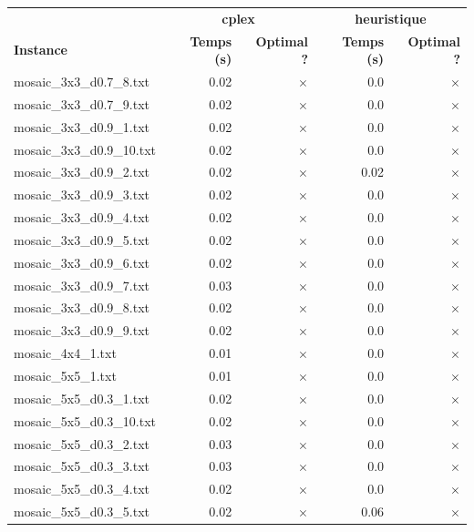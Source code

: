 \documentclass{article}
\begin{document}
\newpage
\begin{center}
\renewcommand{\arraystretch}{1.4} 
 \begin{tabular}{lrrrr}
	\hline
 & \multicolumn{2}{c}{\textbf{cplex}} & \multicolumn{2}{c}{\textbf{heuristique}}\\
\textbf{Instance}  & \textbf{Temps (s)} & \textbf{Optimal ?}  & \textbf{Temps (s)} & \textbf{Optimal ?} \\\hline

mosaic\_3x3\_d0.7\_8.txt & 0.02 & 
$\times$
 & 0.0 & 
$\times$
\\
mosaic\_3x3\_d0.7\_9.txt & 0.02 & 
$\times$
 & 0.0 & 
$\times$
\\
mosaic\_3x3\_d0.9\_1.txt & 0.02 & 
$\times$
 & 0.0 & 
$\times$
\\
mosaic\_3x3\_d0.9\_10.txt & 0.02 & 
$\times$
 & 0.0 & 
$\times$
\\
mosaic\_3x3\_d0.9\_2.txt & 0.02 & 
$\times$
 & 0.02 & 
$\times$
\\
mosaic\_3x3\_d0.9\_3.txt & 0.02 & 
$\times$
 & 0.0 & 
$\times$
\\
mosaic\_3x3\_d0.9\_4.txt & 0.02 & 
$\times$
 & 0.0 & 
$\times$
\\
mosaic\_3x3\_d0.9\_5.txt & 0.02 & 
$\times$
 & 0.0 & 
$\times$
\\
mosaic\_3x3\_d0.9\_6.txt & 0.02 & 
$\times$
 & 0.0 & 
$\times$
\\
mosaic\_3x3\_d0.9\_7.txt & 0.03 & 
$\times$
 & 0.0 & 
$\times$
\\
mosaic\_3x3\_d0.9\_8.txt & 0.02 & 
$\times$
 & 0.0 & 
$\times$
\\
mosaic\_3x3\_d0.9\_9.txt & 0.02 & 
$\times$
 & 0.0 & 
$\times$
\\
mosaic\_4x4\_1.txt & 0.01 & 
$\times$
 & 0.0 & 
$\times$
\\
mosaic\_5x5\_1.txt & 0.01 & 
$\times$
 & 0.0 & 
$\times$
\\
mosaic\_5x5\_d0.3\_1.txt & 0.02 & 
$\times$
 & 0.0 & 
$\times$
\\
mosaic\_5x5\_d0.3\_10.txt & 0.02 & 
$\times$
 & 0.0 & 
$\times$
\\
mosaic\_5x5\_d0.3\_2.txt & 0.03 & 
$\times$
 & 0.0 & 
$\times$
\\
mosaic\_5x5\_d0.3\_3.txt & 0.03 & 
$\times$
 & 0.0 & 
$\times$
\\
mosaic\_5x5\_d0.3\_4.txt & 0.02 & 
$\times$
 & 0.0 & 
$\times$
\\
mosaic\_5x5\_d0.3\_5.txt & 0.02 & 
$\times$
 & 0.06 & 
$\times$
\\

\end{tabular}
\end{center}
\end{document}
